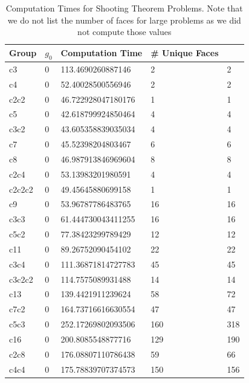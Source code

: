 \documentclass{article}
\begin{document}
	\begin{table}[]
		\centering
		\caption{Computation Times for Shooting Theorem Problems. Note that we do not list the number of faces for large problems as we did not compute those values}
		\label{shooting1}
		\begin{tabular}{@{}lllll@{}}
			\toprule
			Group    & $g_0$ & Computation Time   & \# Unique Faces &  \\ \midrule
			c3       & 0     & 113.4690260887146  & 2 & 2             \\
			c4       & 0     & 52.40028500556946  & 2 & 2             \\
			c2c2     & 0     & 46.722928047180176 & 1 & 1             \\
			c5       & 0     & 42.618799924850464 & 4 & 4             \\
			c3c2     & 0     & 43.605358839035034 & 4 & 4             \\
			c7       & 0     & 45.52398204803467  & 6 & 6             \\
			c8       & 0     & 46.987913846969604 & 8 & 8             \\
			c2c4     & 0     & 53.13983201980591  & 4 & 4             \\
			c2c2c2   & 0     & 49.45645880699158  & 1 & 1             \\
			c9       & 0     & 53.96787786483765  & 16 & 16            \\
			c3c3     & 0     & 61.444730043411255 & 16 & 16            \\
			c5c2     & 0     & 77.38423299789429  & 12 & 12             \\
			c11      & 0     & 89.26752090454102  & 22 & 22             \\
			c3c4     & 0     & 111.36871814727783 & 45 & 45            \\
			c3c2c2   & 0     & 114.7575089931488  & 14 & 14             \\
			c13      & 0     & 139.4421911239624  & 58 & 72            \\
			c7c2     & 0     & 164.73716616630554 & 47 & 47            \\
			c5c3     & 0     & 252.17269802093506 & 160 & 318            \\
			c16      & 0     & 200.8085548877716  & 129 & 190          \\
			c2c8     & 0     & 176.08807110786438 & 59  & 66            \\
			c4c4     & 0     & 175.78839707374573 & 150 & 156            \\

\end{tabular}
\end{table}
\end{document}
